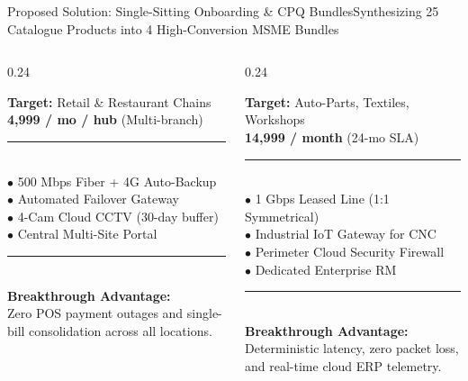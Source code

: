 \documentclass[aspectratio=169,10pt]{beamer}
\newcommand{\inr}{\text{Rs.\ }}
\begin{document}
\begin{frame}{Proposed Solution: Single-Sitting Onboarding \& CPQ Bundles}{Synthesizing 25 Catalogue Products into 4 High-Conversion MSME Bundles}
\begin{columns}[T]
    \begin{column}{0.24\textwidth}
      \begin{tcolorbox}[academicbox, title={\fontsize{5.5pt}{6.6pt}\selectfont\textbf{Udyam Multi-Site}}, coltitle=charcoal]
        {\fontsize{4.6pt}{5.5pt}\selectfont
        \textbf{Target:} Retail \& Restaurant Chains \\
        \textbf{\inr 4,999 / mo / hub} (Multi-branch) \\
        \textcolor{bordergray}{\rule{\linewidth}{0.25pt}} \\
        $\bullet$ 500 Mbps Fiber + 4G Auto-Backup \\
        $\bullet$ Automated Failover Gateway \\
        $\bullet$ 4-Cam Cloud CCTV (30-day buffer) \\
        $\bullet$ Central Multi-Site Portal \\
        \textcolor{bordergray}{\rule{\linewidth}{0.25pt}} \\
        \textbf{Breakthrough Advantage:} \\
        Zero POS payment outages and single-bill consolidation across all locations.
        }
      \end{tcolorbox}
    \end{column}

    \begin{column}{0.24\textwidth}
      \begin{tcolorbox}[academicbox, title={\fontsize{5.5pt}{6.6pt}\selectfont\textbf{Udyam Industrial}}, coltitle=charcoal]
        {\fontsize{4.6pt}{5.5pt}\selectfont
        \textbf{Target:} Auto-Parts, Textiles, Workshops \\
        \textbf{\inr 14,999 / month} (24-mo SLA) \\
        \textcolor{bordergray}{\rule{\linewidth}{0.25pt}} \\
        $\bullet$ 1 Gbps Leased Line (1:1 Symmetrical) \\
        $\bullet$ Industrial IoT Gateway for CNC \\
        $\bullet$ Perimeter Cloud Security Firewall \\
        $\bullet$ Dedicated Enterprise RM \\
        \textcolor{bordergray}{\rule{\linewidth}{0.25pt}} \\
        \textbf{Breakthrough Advantage:} \\
        Deterministic latency, zero packet loss, and real-time cloud ERP telemetry.
        }
      \end{tcolorbox}
    \end{column}
  \end{columns}


\end{frame}
\end{document}
